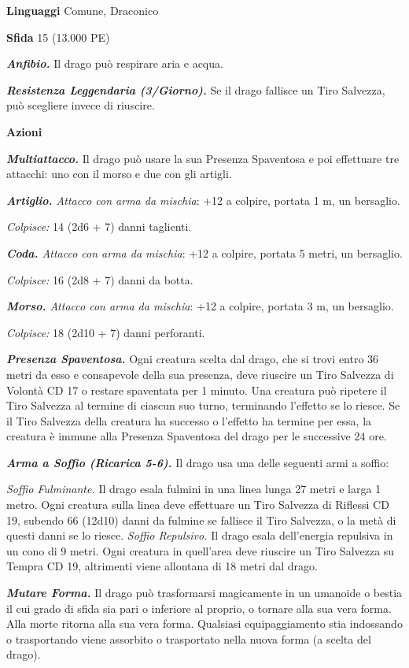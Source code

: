 \begin{multicols}{2}
\textbf{Linguaggi} Comune, Draconico

\textbf{Sfida} 15 (13.000 PE)

\emph{\textbf{Anfibio.}} Il drago può respirare aria e acqua.

\emph{\textbf{Resistenza Leggendaria (3/Giorno).}} Se il drago fallisce un Tiro Salvezza, può scegliere invece di riuscire.

\textbf{Azioni}

\emph{\textbf{Multiattacco.}} Il drago può usare la sua Presenza Spaventosa e poi effettuare tre attacchi: uno con il morso e due con gli
artigli.

\emph{\textbf{Artiglio.} Attacco con arma da mischia}: +12 a colpire, portata 1 m, un bersaglio.

\emph{Colpisce:} 14 (2d6 + 7) danni taglienti.

\emph{\textbf{Coda.} Attacco con arma da mischia}: +12 a colpire, portata 5 metri, un bersaglio.

\emph{Colpisce:} 16 (2d8 + 7) danni da botta.

\emph{\textbf{Morso.} Attacco con arma da mischia}: +12 a colpire, portata 3 m, un bersaglio.

\emph{Colpisce:} 18 (2d10 + 7) danni perforanti.

\emph{\textbf{Presenza Spaventosa.}} Ogni creatura scelta dal drago, che si trovi entro 36 metri da esso e consapevole della sua presenza, deve riuscire un Tiro Salvezza di Volontà CD 17 o restare spaventata per 1 minuto. Una creatura può ripetere il Tiro Salvezza al termine di ciascun suo turno, terminando l'effetto se lo riesce. Se il Tiro Salvezza della creatura ha successo o l'effetto ha termine per essa, la creatura è immune alla Presenza Spaventosa del drago per le successive 24 ore. 

\emph{\textbf{Arma a Soffio (Ricarica 5-6).}} Il drago usa una delle seguenti armi a soffio:

\emph{Soffio Fulminante.} Il drago esala fulmini in una linea lunga 27 metri e larga 1 metro. Ogni creatura sulla linea deve effettuare un Tiro Salvezza di Riflessi CD 19, subendo 66 (12d10) danni da fulmine se fallisce il Tiro Salvezza, o la metà di questi danni se lo riesce. \emph{Soffio Repulsivo.} Il drago esala dell'energia repulsiva in un cono di 9 metri. Ogni creatura in quell'area deve riuscire un Tiro Salvezza su Tempra CD 19, altrimenti viene allontana di 18 metri dal drago.

\emph{\textbf{Mutare Forma.}} Il drago può trasformarsi magicamente in un umanoide o bestia il cui grado di sfida sia pari o inferiore al proprio, o tornare alla sua vera forma. Alla morte ritorna alla sua vera forma. Qualsiasi equipaggiamento stia indossando o trasportando viene assorbito o trasportato nella nuova forma (a scelta del drago).


\end{multicols}
